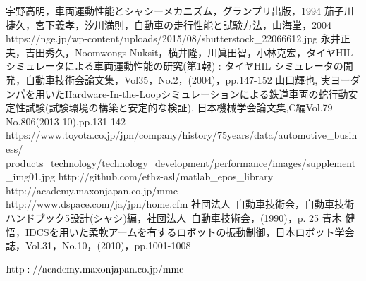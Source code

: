 \documentclass[a4paper,12pt]{article_vdlab_sotsuron}
\begin{document}
\newpage
\begin{thebibliography}{99}
宇野高明，車両運動性能とシャシーメカニズム，グランプリ出版，1994
茄子川捷久，宮下義孝，汐川満則，自動車の走行性能と試験方法，山海堂，2004
https://nge.jp/wp-content/uploads/2015/08/shutterstock\_22066612.jpg
永井正夫，吉田秀久，Noomwongs Nuksit，横井隆，川眞田智，小林克宏，タイヤHIL シミュレータによる車両運動性能の研究(第1報) : タイヤHIL シミュレータの開発，自動車技術会論文集，Vol35，No.2，(2004)，pp.147-152
山口輝也, 実ヨーダンパを用いたHardware-In-the-Loopシミュレーションによる鉄道車両の蛇行動安定性試験(試験環境の構築と安定的な検証), 日本機械学会論文集,C編Vol.79 No.806(2013-10),pp.131-142
https://www.toyota.co.jp/jpn/company/history/75years/data/automotive\_business/ \\ products\_technology/technology\_development/performance/images/supplement\_img01.jpg
http://github.com/ethz-asl/matlab\_epos\_library
http://academy.maxonjapan.co.jp/mmc
http://www.dspace.com/ja/jpn/home.cfm
社団法人\ 自動車技術会，自動車技術ハンドブック5設計(シャシ)編，社団法人\ 自動車技術会，(1990)，p. 25
青木 健悟，IDCSを用いた柔軟アームを有するロボットの振動制御，日本ロボット学会誌，Vol.31，No.10，(2010)，pp.1001-1008

$\rm{http://academy.maxonjapan.co.jp/mmc}$

\end{thebibliography}
\end{document}
